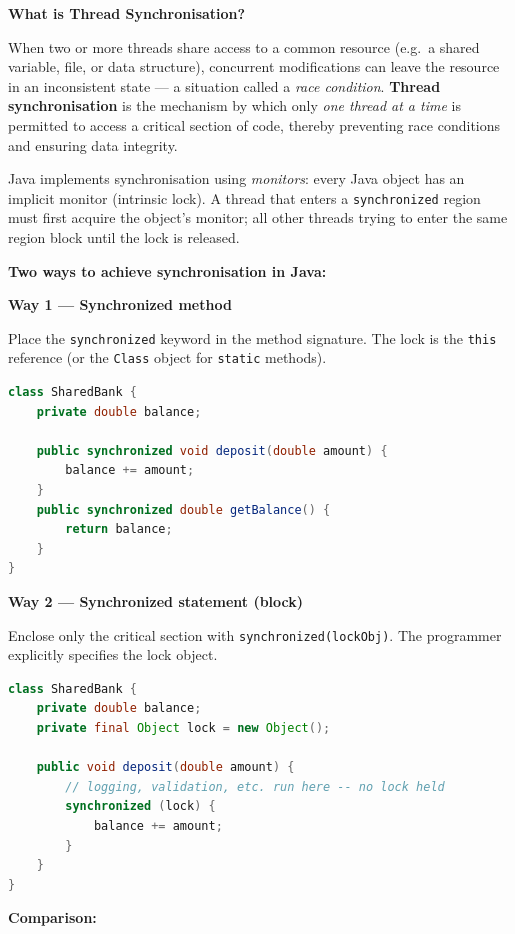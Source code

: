 \documentclass[12pt,a3paper]{article}
\begin{document}
\begin{enumerate}
\begin{tcolorbox}[enhanced,breakable,ansbox,
  colback=cF!4,colframe=cF,boxrule=0.8pt,arc=5pt,
  title={\textbf{Answer — Thread Synchronisation}},
  fonttitle=\bfseries\color{white},colbacktitle=cF]
\textbf{What is Thread Synchronisation?}

When two or more threads share access to a common resource (e.g.\ a
shared variable, file, or data structure), concurrent modifications
can leave the resource in an inconsistent state — a situation called
a \emph{race condition}.  \textbf{Thread synchronisation} is the
mechanism by which only \emph{one thread at a time} is permitted to
access a critical section of code, thereby preventing race conditions
and ensuring data integrity.

Java implements synchronisation using \emph{monitors}: every Java
object has an implicit monitor (intrinsic lock).  A thread that enters
a \texttt{synchronized} region must first acquire the object's monitor;
all other threads trying to enter the same region block until the
lock is released.

\medskip
\textbf{Two ways to achieve synchronisation in Java:}

\medskip
\textbf{Way 1 --- Synchronized method}

Place the \texttt{synchronized} keyword in the method signature.  The
lock is the \texttt{this} reference (or the \texttt{Class} object for
\texttt{static} methods).

\begin{lstlisting}[language=Java]
class SharedBank {
    private double balance;

    public synchronized void deposit(double amount) {
        balance += amount;
    }
    public synchronized double getBalance() {
        return balance;
    }
}
\end{lstlisting}

\medskip
\textbf{Way 2 --- Synchronized statement (block)}

Enclose only the critical section with \texttt{synchronized(lockObj)}.
The programmer explicitly specifies the lock object.

\begin{lstlisting}[language=Java]
class SharedBank {
    private double balance;
    private final Object lock = new Object();

    public void deposit(double amount) {
        // logging, validation, etc. run here -- no lock held
        synchronized (lock) {
            balance += amount;
        }
    }
}
\end{lstlisting}

\medskip
\textbf{Comparison:}


\end{tcolorbox}
\end{enumerate}
\end{document}
